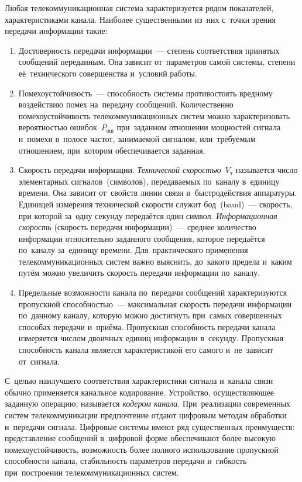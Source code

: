 \documentclass[
	a4paper,
	oneside,
	BCOR = 10mm,
	DIV = 12,
	12pt,
	headings = normal,
]{scrartcl}
\begin{document}
				Любая телекоммуникационная система характеризуется рядом показателей, характеристиками канала. Наиболее существенными из~них с~точки зрения передачи информации такие:
				\begin{enumerate}
					\item Достоверность передачи информации~— степень соответствия принятых сообщений переданным. Она зависит от~параметров самой системы, степени её~технического совершенства и~условий работы.
					\item Помехоустойчивость~— способность системы противостоять вредному воздействию помех на~передачу сообщений. Количественно помехоустойчивость телекоммуникационных систем можно характеризовать вероятностью ошибок~$P_{\text{ош}}$ при~заданном отношении мощностей сигнала и~помехи в~полосе частот, занимаемой сигналом, или~требуемым отношением, при~котором обеспечивается заданная.
					\item Скорость передачи информации. \emph{Технической скоростью}~$V_{\text{т}}$ называется число элементарных сигналов~(символов), передаваемых по~каналу в~единицу времени. Она зависит от~свойств линии связи и~быстродействия аппаратуры. Единицей измерения технической скорости служит бод~(baud)~— скорость, при которой за~одну секунду передаётся один символ. \emph{Информационная скорость} (скорость передачи информации)~— среднее количество информации относительно заданного сообщения, которое передаётся по~каналу за~единицу времени. Для~практического применения телекоммуникационных систем важно выяснить, до~какого предела и~каким путём можно увеличить скорость передачи информации по~каналу.
					\item Предельные возможности канала по~передачи сообщений характеризуются пропускной способностью~— максимальная скорость передачи информации по~данному каналу, которую можно достигнуть при~самых совершенных способах передачи и~приёма. Пропускная способность передачи канала измеряется числом двоичных единиц информации в~секунду. Пропускная способность канала является характеристикой его самого и~не~зависит от~сигнала. 
				\end{enumerate}
				
				С~целью наилучшего соответствия характеристики сигнала и~канала связи обычно применяется канальное кодирование. Устройство, осуществляющее заданную операцию, называется \emph{кодером канала}. При~реализации современных систем телекоммуникации предпочтение отдают цифровым методам обработки и~передачи сигнала. Цифровые системы имеют ряд существенных преимуществ: представление сообщений в~цифровой форме обеспечивают более высокую помехоустойчивость, возможность более полного использование пропускной способности канала, стабильность параметров передачи и~гибкость при~построении телекоммуникационных систем.
\end{document}
